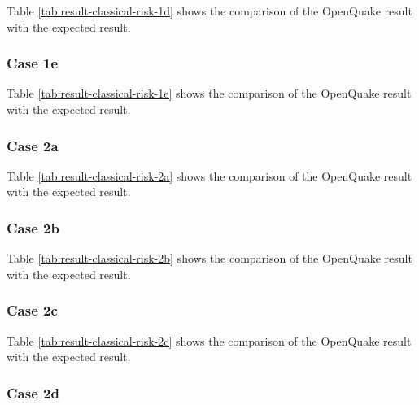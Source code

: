 

Table \ref{tab:result-classical-risk-1d} shows the comparison of the OpenQuake result with the expected result.

\subsubsection{Case 1e}




Table \ref{tab:result-classical-risk-1e} shows the comparison of the OpenQuake result with the expected result.

\subsubsection{Case 2a}




Table \ref{tab:result-classical-risk-2a} shows the comparison of the OpenQuake result with the expected result.

\subsubsection{Case 2b}




Table \ref{tab:result-classical-risk-2b} shows the comparison of the OpenQuake result with the expected result.

\subsubsection{Case 2c}




Table \ref{tab:result-classical-risk-2c} shows the comparison of the OpenQuake result with the expected result.

\subsubsection{Case 2d}


